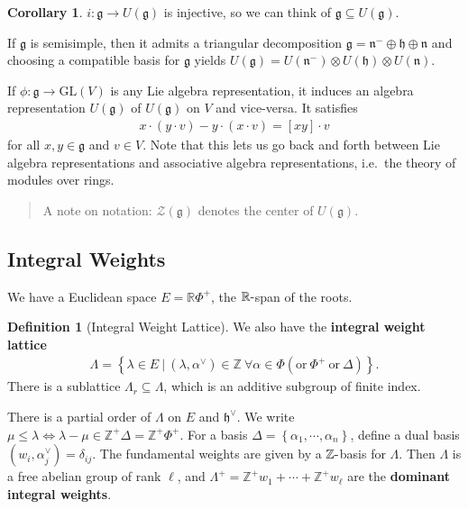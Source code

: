 \documentclass[11pt]{scrartcl}
\theoremstyle{definition}
\theoremstyle{theorem}
\newtheorem{corollary}[theorem]{Corollary}
\theoremstyle{proof}
\theoremstyle{definition}
\newtheorem{definition}{Definition}[theorem]
\theoremstyle{break}
\theoremstyle{problem}
\newcommand{\RR}[0]{{\mathbb{R}}}
\newcommand{\ZZ}[0]{{\mathbb{Z}}}
\newcommand{\gl}[0]{\mathrm{GL}}
\newcommand{\dash}[0]{{\hbox{-}}}
\newcommand{\dual}[0]{^\vee}
\newcommand{\lieg}[0]{{\mathfrak{g}}}
\newcommand{\lieh}[0]{{\mathfrak{h}}}
\newcommand{\lien}[0]{{\mathfrak{n}}}
\newcommand{\suchthat}[0]{{~\mathrel{\Big|}~}}
\newcommand{\tensor}[0]{\otimes}
\newcommand{\theset}[1]{\left\{{#1}\right\}}
\renewcommand{\to}[0]{\longrightarrow}
\begin{document}
\begin{corollary}

\(i:\lieg \to U(\lieg)\) is injective, so we can think of
\(\lieg \subseteq U(\lieg)\).\end{corollary}

If \(\lieg\) is semisimple, then it admits a triangular decomposition
\(\lieg = \lien^- \oplus \lieh \oplus \lien\) and choosing a compatible
basis for \(\lieg\) yields
\(U(\lieg) = U(\lien^-)\tensor U(\lieh) \tensor U(\lien)\).

If \(\phi: \lieg \to \gl(V)\) is any Lie algebra representation, it
induces an algebra representation \(U(\lieg)\) of \(U(\lieg)\) on \(V\)
and vice-versa. It satisfies
\begin{align*}x\cdot (y \cdot v) - y\cdot (x \cdot v) = [x y] \cdot v\end{align*}
for all \(x,y \in \lieg\) and \(v\in V\). Note that this lets us go back
and forth between Lie algebra representations and associative algebra
representations, i.e.~the theory of modules over rings.

\begin{quote}
A note on notation: \(\mathcal Z(\lieg)\) denotes the center of
\(U(\lieg)\).
\end{quote}

\hypertarget{integral-weights}{%
\subsection{Integral Weights}\label{integral-weights}}

We have a Euclidean space \(E = \RR \Phi^+\), the \(\RR\dash\)span of
the roots.

\begin{definition}[Integral Weight Lattice]

We also have the \textbf{integral weight lattice}
\begin{align*}
  \Lambda = \theset{\lambda \in E \suchthat (\lambda, \alpha\dual) \in \ZZ ~\forall \alpha\in\Phi (\text{or}~ \Phi^+ ~\text{or}~ \Delta)}
  .\end{align*} There is a sublattice \(\Lambda_r \subseteq \Lambda\),
which is an additive subgroup of finite index.\end{definition}

There is a partial order of \(\Lambda\) on \(E\) and \(\lieh\dual\). We
write
\(\mu \leq \lambda \iff \lambda - \mu \in \ZZ^+ \Delta = \ZZ^+ \Phi^+\).
For a basis \(\Delta = \theset{\alpha_1, \cdots, \alpha_n}\), define a
dual basis \((w_i ,\alpha_j\dual) = \delta_{ij}\). The fundamental
weights are given by a \(\ZZ\dash\)basis for \(\Lambda\). Then
\(\Lambda\) is a free abelian group of rank \(\ell\), and
\(\Lambda^+ = \ZZ^+ w_1 + \cdots + \ZZ^+ w_\ell\) are the
\textbf{dominant integral weights}.
\end{document}
